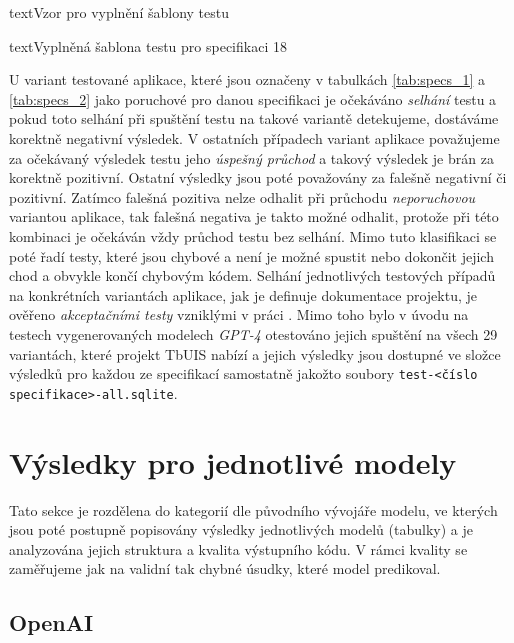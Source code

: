 \documentclass[czech, ma, kiv, he, iso690numb, pdf, viewonly]{fasthesis}
\begin{document}
\begin{code}{text}{Vzor pro vyplnění šablony testu \label{lst:template}}
{\begin{code}{text}{Vyplněná šablona testu pro specifikaci 18 \label{lst:spec18}}
{        U variant testované aplikace, které jsou označeny v tabulkách \ref{tab:specs_1} a \ref{tab:specs_2} jako poruchové pro danou specifikaci je očekáváno \textit{selhání} testu a pokud toto selhání při spuštění testu na takové variantě detekujeme, dostáváme korektně negativní výsledek. V ostatních případech variant aplikace považujeme za očekávaný výsledek testu jeho \textit{úspešný průchod} a takový výsledek je brán za korektně pozitivní. Ostatní výsledky jsou poté považovány za falešně negativní či pozitivní. Zatímco falešná pozitiva nelze odhalit při průchodu \textit{neporuchovou} variantou aplikace, tak falešná negativa je takto možné odhalit, protože při této kombinaci je očekáván vždy průchod testu bez selhání. Mimo tuto klasifikaci se poté řadí testy, které jsou chybové a není je možné spustit nebo dokončit jejich chod a obvykle končí chybovým kódem. Selhání jednotlivých testových případů na konkrétních variantách aplikace, jak je definuje dokumentace projektu, je ověřeno \textit{akceptačními testy} vzniklými v práci \cite{Vais2020}. Mimo toho bylo v úvodu na testech vygenerovaných modelech \textit{GPT-4} otestováno jejich spuštění na všech 29 variantách, které projekt TbUIS nabízí a jejich výsledky jsou dostupné ve složce výsledků pro každou ze specifikací samostatně jakožto soubory \verb|test-<číslo specifikace>-all.sqlite|. 

    \section{Výsledky pro jednotlivé modely} \label{sec:results}

        Tato sekce je rozdělena do kategorií dle původního vývojáře modelu, ve kterých jsou poté postupně popisovány výsledky jednotlivých modelů (tabulky) a je analyzována jejich struktura a kvalita výstupního kódu. V rámci kvality se zaměřujeme jak na validní tak chybné úsudky, které model predikoval.
    
        \subsection{OpenAI} \label{sec:res:openai}

}
\end{code}}
\end{code}
\end{document}
